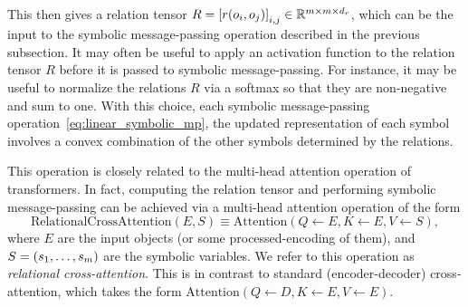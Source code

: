 This then gives a relation tensor $R = \left[r(o_i, o_j)\right]_{i,j} \in \mathbb{R}^{m \times m \times d_r}$, which can be the input to the symbolic message-passing operation described in the previous subsection. It may often be useful to apply an activation function to the relation tensor $R$ before it is passed to symbolic message-passing. For instance, it may be useful to normalize the relations $R$ via a softmax so that they are non-negative and sum to one. With this choice, each symbolic message-passing operation~\cref{eq:linear_symbolic_mp}, the updated representation of each symbol involves a convex combination of the other symbols determined by the relations.

This operation is closely related to the multi-head attention operation of transformers. In fact, computing the relation tensor and performing symbolic message-passing can be achieved via a multi-head attention operation of the form
\begin{equation}\label{eq:relation_crossattention}
    \text{RelationalCrossAttention}\left(E, S\right) \equiv \text{Attention}\left( Q \gets E, K \gets E, V \gets S \right),
\end{equation}
where $E$ are the input objects (or some processed-encoding of them), and $S = (s_1, \ldots, s_m)$ are the symbolic variables. We refer to this operation as \textit{relational cross-attention}. This is in contrast to standard (encoder-decoder) cross-attention, which takes the form $\text{Attention}\left( Q \gets D, K \gets E, V \gets E \right)$.





